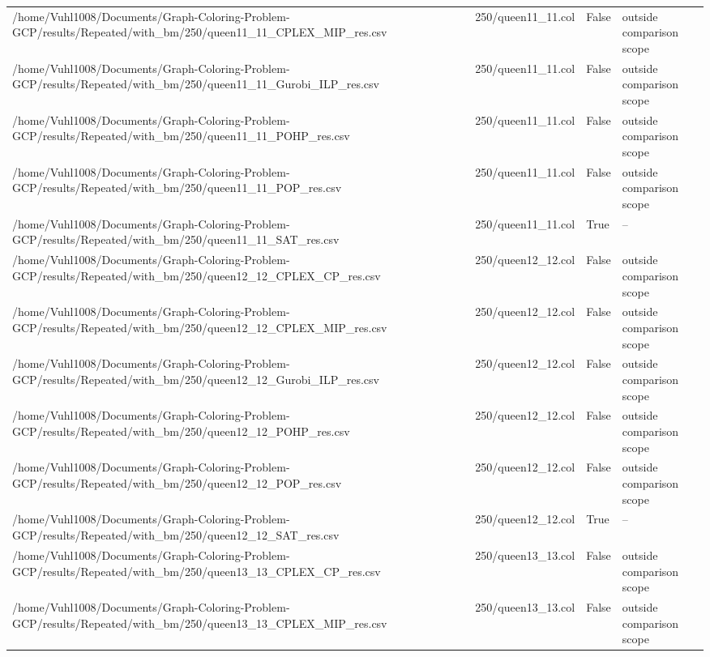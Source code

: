 \begin{table}[htbp]
\begin{tabular}{llll}
/home/Vuhl1008/Documents/Graph-Coloring-Problem-GCP/results/Repeated/with\_bm/250/queen11\_11\_CPLEX\_MIP\_res.csv & 250/queen11\_11.col & False & outside comparison scope \\
/home/Vuhl1008/Documents/Graph-Coloring-Problem-GCP/results/Repeated/with\_bm/250/queen11\_11\_Gurobi\_ILP\_res.csv & 250/queen11\_11.col & False & outside comparison scope \\
/home/Vuhl1008/Documents/Graph-Coloring-Problem-GCP/results/Repeated/with\_bm/250/queen11\_11\_POHP\_res.csv & 250/queen11\_11.col & False & outside comparison scope \\
/home/Vuhl1008/Documents/Graph-Coloring-Problem-GCP/results/Repeated/with\_bm/250/queen11\_11\_POP\_res.csv & 250/queen11\_11.col & False & outside comparison scope \\
/home/Vuhl1008/Documents/Graph-Coloring-Problem-GCP/results/Repeated/with\_bm/250/queen11\_11\_SAT\_res.csv & 250/queen11\_11.col & True & -- \\
/home/Vuhl1008/Documents/Graph-Coloring-Problem-GCP/results/Repeated/with\_bm/250/queen12\_12\_CPLEX\_CP\_res.csv & 250/queen12\_12.col & False & outside comparison scope \\
/home/Vuhl1008/Documents/Graph-Coloring-Problem-GCP/results/Repeated/with\_bm/250/queen12\_12\_CPLEX\_MIP\_res.csv & 250/queen12\_12.col & False & outside comparison scope \\
/home/Vuhl1008/Documents/Graph-Coloring-Problem-GCP/results/Repeated/with\_bm/250/queen12\_12\_Gurobi\_ILP\_res.csv & 250/queen12\_12.col & False & outside comparison scope \\
/home/Vuhl1008/Documents/Graph-Coloring-Problem-GCP/results/Repeated/with\_bm/250/queen12\_12\_POHP\_res.csv & 250/queen12\_12.col & False & outside comparison scope \\
/home/Vuhl1008/Documents/Graph-Coloring-Problem-GCP/results/Repeated/with\_bm/250/queen12\_12\_POP\_res.csv & 250/queen12\_12.col & False & outside comparison scope \\
/home/Vuhl1008/Documents/Graph-Coloring-Problem-GCP/results/Repeated/with\_bm/250/queen12\_12\_SAT\_res.csv & 250/queen12\_12.col & True & -- \\
/home/Vuhl1008/Documents/Graph-Coloring-Problem-GCP/results/Repeated/with\_bm/250/queen13\_13\_CPLEX\_CP\_res.csv & 250/queen13\_13.col & False & outside comparison scope \\
/home/Vuhl1008/Documents/Graph-Coloring-Problem-GCP/results/Repeated/with\_bm/250/queen13\_13\_CPLEX\_MIP\_res.csv & 250/queen13\_13.col & False & outside comparison scope \\

\end{tabular}
\end{table}
